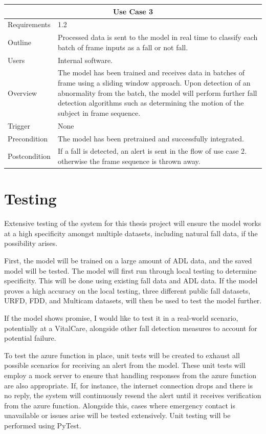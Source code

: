 \begin{table}[H]
    \centering
    \begin{tabular}{ |p{2.8cm}|p{8cm}|}
     \hline
     \multicolumn{2}{|c|}{Use Case 3} \\
     \hline
      Requirements&1.2\\
     \hline
     Outline &Processed data is sent to the model in real time to classify each batch of frame inputs as a fall or not fall.\\
     \hline
     Users&Internal software.\\
     \hline
     Overview&The model has been trained and receives data in batches of frame using a sliding window approach. Upon detection of an abnormality from the batch, the model will perform further fall detection algorithms such as determining the motion of the subject in frame sequence.\\
     \hline
     Trigger&None\\
     \hline
     Precondition&The model has been pretrained and successfully integrated.\\
     \hline
     Postcondition&If a fall is detected, an alert is sent in the flow of use case 2. otherwise the frame sequence is thrown away.\\
     \hline
    \end{tabular}
\end{table}

\section{Testing}

Extensive testing of the system for this thesis project will ensure the model works at a high specificity amongst multiple datasets, including natural fall data, if the possibility arises.

First, the model will be trained on a large amount of ADL data, and the saved model will be tested. The model will first run through local testing to determine specificity. This will be done using existing fall data and ADL data. If the model proves a high accuracy on the local testing, three different public fall datasets, URFD, FDD, and Multicam datasets, will then be used to test the model further. 

If the model shows promise, I would like to test it in a real-world scenario, potentially at a VitalCare, alongside other fall detection measures to account for potential failure. 

To test the azure function in place, unit tests will be created to exhaust all possible scenarios for receiving an alert from the model. These unit tests will employ a mock server to ensure that handling responses from the azure function are also appropriate. If, for instance, the internet connection drops and there is no reply, the system will continuously resend the alert until it receives verification from the azure function. Alongside this, cases where emergency contact is unavailable or issues arise will be tested extensively. Unit testing will be performed using PyTest.

